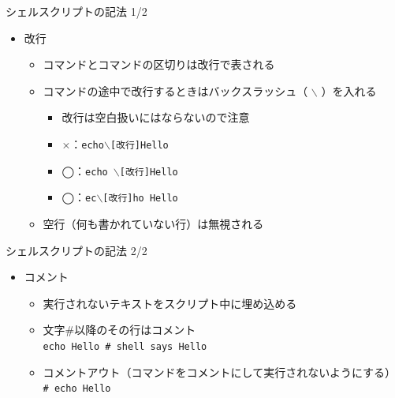 \documentclass[12pt,aspectratio=169]{beamer}
\begin{document}
\begin{frame}{シェルスクリプトの記法 1/2}
  \begin{itemize}
    \item 改行
      \begin{itemize}
        \item コマンドとコマンドの区切りは改行で表される
        \item コマンドの途中で改行するときはバックスラッシュ（ $\backslash$ ）を入れる
          \begin{itemize}
            \item 改行は空白扱いにはならないので注意
            \item ×：\texttt{echo$\backslash$[改行]Hello}
            \item ◯：\texttt{echo $\backslash$[改行]Hello}
            \item ◯：\texttt{ec$\backslash$[改行]ho Hello}
          \end{itemize}

        \item 空行（何も書かれていない行）は無視される
      \end{itemize}

  \end{itemize}

\end{frame}


\begin{frame}{シェルスクリプトの記法 2/2}
  \begin{itemize}
    \item コメント
      \begin{itemize}
        \item 実行されないテキストをスクリプト中に埋め込める
        \item 文字\#以降のその行はコメント\\
          \texttt{echo Hello \# shell says Hello }
        \item コメントアウト（コマンドをコメントにして実行されないようにする）\\
          \texttt{\# echo Hello }
      \end{itemize}

  \end{itemize}

\end{frame}
\end{document}
